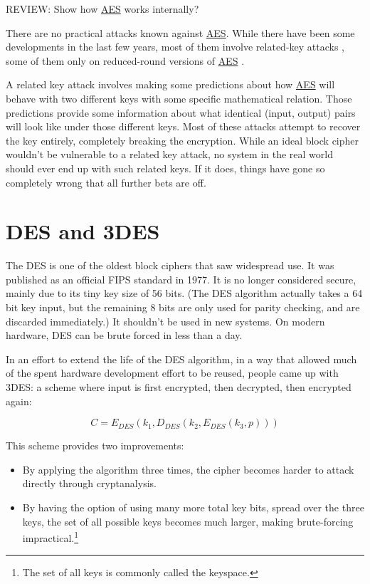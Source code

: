\documentclass[11pt,ebook,table,dvipsnames]{memoir}
\begin{document}
REVIEW: Show how \hyperref[AES]{AES} works internally?

There are no practical attacks known against \hyperref[AES]{AES}. While there have
been some developments in the last few years, most of them involve
related-key attacks \cite{cryptoeprint:2009:317}, some of them only on
reduced-round versions of \hyperref[AES]{AES} \cite{cryptoeprint:2009:374}.

A related key attack involves making some predictions about how \hyperref[AES]{AES}
will behave with two different keys with some specific mathematical
relation. Those predictions provide some information about what
identical (input, output) pairs will look like under those different
keys. Most of these attacks attempt to recover the key entirely,
completely breaking the encryption. While an ideal block cipher
wouldn't be vulnerable to a related key attack, no system in the real
world should ever end up with such related keys. If it does, things
have gone so completely wrong that all further bets are off.
\section{DES and 3DES}
\label{sec-2-2-3}

The \gls{DES} is one of the oldest block ciphers that saw widespread
use. It was published as an official \gls{FIPS} standard in 1977. It
is no longer considered secure, mainly due to its tiny key size of 56
bits. (The DES algorithm actually takes a 64 bit key input, but the
remaining 8 bits are only used for parity checking, and are discarded
immediately.) It shouldn't be used in new systems. On modern hardware,
DES can be brute forced in less than a day. \cite{sciengines:breakdes}

In an effort to extend the life of the DES algorithm, in a way that
allowed much of the spent hardware development effort to be reused,
people came up with 3DES: a scheme where input is first encrypted,
then decrypted, then encrypted again:

\begin{equation}
C = E_{DES}(k_1, D_{DES}(k_2, E_{DES}(k_3, p)))
\end{equation}

This scheme provides two improvements:

\begin{itemize}
\item By applying the algorithm three times, the cipher becomes harder to
attack directly through cryptanalysis.
\item By having the option of using many more total key bits, spread over
the three keys, the set of all possible keys becomes much larger,
making brute-forcing impractical.\footnote{The set of all keys is
   commonly called the keyspace.}
\end{itemize}
\end{document}
